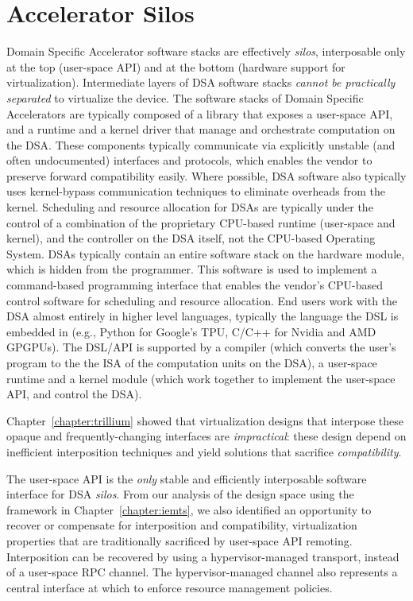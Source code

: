 \section{Accelerator Silos}

Domain Specific Accelerator software stacks are effectively \emph{silos},
interposable only at the top (user-space API) and at the bottom (hardware
support for virtualization). Intermediate layers of DSA software stacks
\emph{cannot be practically separated} to virtualize the device.
The software stacks of Domain Specific Accelerators are typically composed of
a library that exposes a user-space API, and a runtime and a kernel driver
that manage and orchestrate computation on the DSA. These components typically
communicate via explicitly unstable (and often undocumented) interfaces and
protocols, which enables the vendor to preserve forward compatibility easily.
Where possible, DSA software also typically uses kernel-bypass communication
techniques to eliminate overheads from the kernel. Scheduling and resource
allocation for DSAs are typically under the control of a combination of the
proprietary CPU-based runtime (user-space and kernel), and the controller on
the DSA itself, not the CPU-based Operating System. DSAs typically contain an
entire software stack on the hardware module, which is hidden from the
programmer. This software is used to implement a command-based programming
interface that enables the vendor’s CPU-based control software for scheduling
and resource allocation. End users work with the DSA almost entirely in higher
level languages, typically the language the DSL is embedded in (e.g., Python
for Google’s TPU, C/C++ for Nvidia and AMD GPGPUs). The DSL/API is supported
by a compiler (which converts the user’s program to the the ISA of the
computation units on the DSA), a user-space runtime and a kernel module (which
work together to implement the user-space API, and control the DSA).

Chapter~\ref{chapter:trillium} showed that virtualization
designs that interpose these opaque and frequently-changing interfaces are
\emph{impractical}: these design depend on inefficient interposition
techniques and yield solutions that sacrifice \emph{compatibility}.

The user-space API is the \emph{only} stable and efficiently interposable
software interface for DSA \textit{silos}. From our analysis of the design
space using the \iemts framework in Chapter~\ref{chapter:iemts}, we also
identified an opportunity to recover or compensate for interposition and
compatibility, virtualization properties that are traditionally sacrificed by
user-space API remoting. Interposition can be recovered by using a
hypervisor-managed transport, instead of a user-space RPC channel. The
hypervisor-managed channel also represents a central interface at which to
enforce resource management policies.